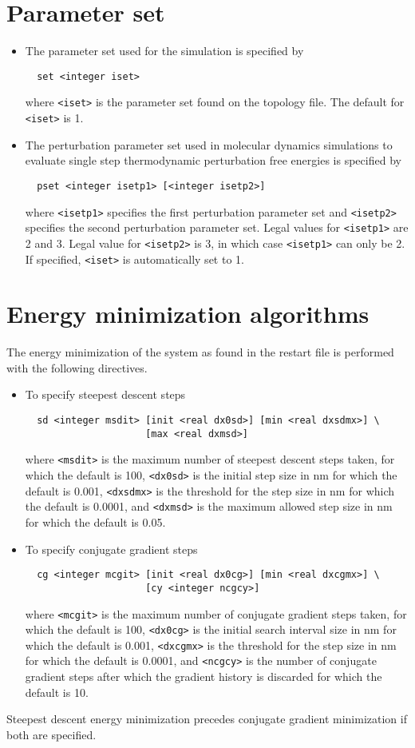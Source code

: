 \section{Parameter set}
\begin{itemize}
\item
The parameter set used for the simulation is specified by
\begin{verbatim}
  set <integer iset>
\end{verbatim}
where \verb+<iset>+ is the parameter set found on the
topology file. The default for \verb+<iset>+ is 1.
\item
The perturbation parameter set used in molecular dynamics simulations
to evaluate single step thermodynamic perturbation free energies is 
specified by
\begin{verbatim}
  pset <integer isetp1> [<integer isetp2>]
\end{verbatim}
where \verb+<isetp1>+ specifies the first perturbation parameter set and
\verb+<isetp2>+ specifies the second perturbation parameter set. Legal
values for \verb+<isetp1>+ are 2 and 3. Legal value for \verb+<isetp2>+ is
3, in which case \verb+<isetp1>+ can only be 2. If specified, \verb+<iset>+
is automatically set to 1.
\end{itemize}

\section{Energy minimization algorithms}
The energy minimization of the system as found in the restart file 
is performed with the following directives.
\begin{itemize}
\item
To specify steepest descent steps
\begin{verbatim}
  sd <integer msdit> [init <real dx0sd>] [min <real dxsdmx>] \
                     [max <real dxmsd>] 
\end{verbatim}
where \verb+<msdit>+ is the maximum number of steepest descent steps taken,
for which the default is 100, \verb+<dx0sd>+ is the initial step size in nm
for which the default is 0.001, \verb+<dxsdmx>+ is the threshold for the
step size in nm for which the default is 0.0001, and \verb+<dxmsd>+ is the
maximum allowed step size in nm for which the default is 0.05.
\item
To specify conjugate gradient steps
\begin{verbatim}
  cg <integer mcgit> [init <real dx0cg>] [min <real dxcgmx>] \
                     [cy <integer ncgcy>]
\end{verbatim}
where \verb+<mcgit>+ is the maximum number of conjugate gradient steps taken,
for which the default is 100, \verb+<dx0cg>+ is the initial search
interval size in nm
for which the default is 0.001, \verb+<dxcgmx>+ is the threshold for the
step size in nm for which the default is 0.0001, and \verb+<ncgcy>+
is the number of conjugate gradient steps after which the gradient history
is discarded for which the default is 10.
\end{itemize}
Steepest descent energy minimization precedes conjugate 
gradient minimization if both are specified.

